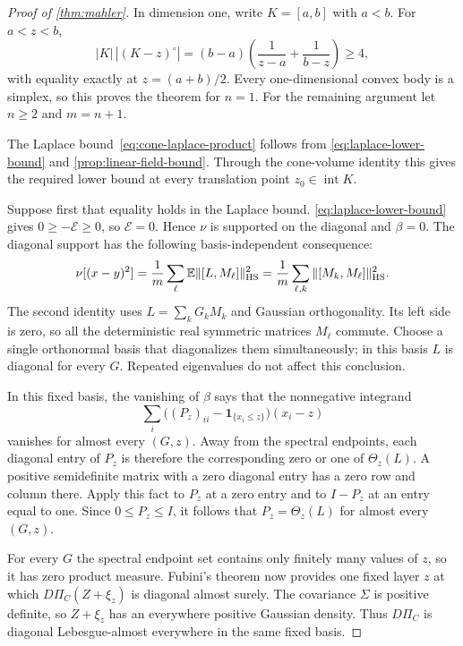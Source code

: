 \begin{proof}[Proof of \cref{thm:mahler}]
In dimension one, write $K=[a,b]$ with $a<b$. For $a<z<b$,
\[
 |K|\,|(K-z)^\circ|
 =(b-a)\left(\frac1{z-a}+\frac1{b-z}\right)\ge4,
\]
with equality exactly at $z=(a+b)/2$. Every one-dimensional convex body is a simplex, so this proves the theorem for $n=1$. For the remaining argument let $n\ge2$ and $m=n+1$.

The Laplace bound~\eqref{eq:cone-laplace-product} follows from \eqref{eq:laplace-lower-bound} and \cref{prop:linear-field-bound}.  Through the cone-volume identity this gives the required lower bound at every translation point $z_0\in\operatorname{int}K$.

Suppose first that equality holds in the Laplace bound.  \eqref{eq:laplace-lower-bound} gives $0\ge-\mathcal{E}\ge0$, so $\mathcal{E}=0$.  Hence $\nu$ is supported on the diagonal and $\beta=0$.  The diagonal support has the following basis-independent consequence:
\[
 \nu[(x-y)^2]
   =\frac1m\sum_\ell\mathbb{E}\|[L,M_\ell]\|_{\rm HS}^2
   =\frac1m\sum_{\ell,k}\|[M_k,M_\ell]\|_{\rm HS}^2.
\]
The second identity uses $L=\sum_kG_kM_k$ and Gaussian orthogonality. Its left side is zero, so all the deterministic real symmetric matrices $M_\ell$ commute.  Choose a single orthonormal basis that diagonalizes them simultaneously; in this basis $L$ is diagonal for every $G$. Repeated eigenvalues do not affect this conclusion.

In this fixed basis, the vanishing of $\beta$ says that the nonnegative integrand
\[
 \sum_i\bigl((P_z)_{ii}-\mathbf1_{\{x_i\le z\}}\bigr)(x_i-z)
\]
vanishes for almost every $(G,z)$.  Away from the spectral endpoints, each diagonal entry of $P_z$ is therefore the corresponding zero or one of $\Theta_z(L)$.  A positive semidefinite matrix with a zero diagonal entry has a zero row and column there.  Apply this fact to $P_z$ at a zero entry and to $I-P_z$ at an entry equal to one. Since $0\le P_z\le I$, it follows that $P_z=\Theta_z(L)$ for almost every $(G,z)$.

For every $G$ the spectral endpoint set contains only finitely many values of $z$, so it has zero product measure.  Fubini's theorem now provides one fixed layer $z$ at which $D\Pi_C(Z+\xi_z)$ is diagonal almost surely.  The covariance $\Sigma$ is positive definite, so $Z+\xi_z$ has an everywhere positive Gaussian density.  Thus $D\Pi_C$ is diagonal Lebesgue-almost everywhere in the same fixed basis.


\end{proof}
